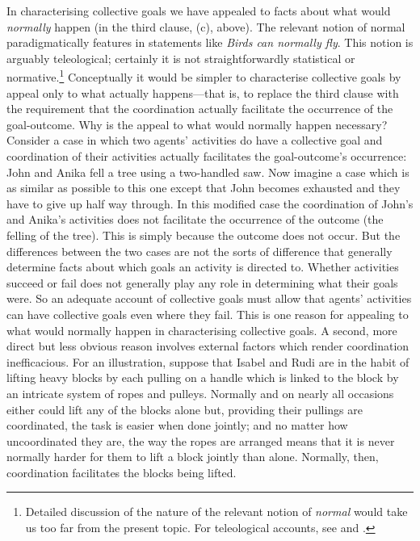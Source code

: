 \documentclass[12pt,a4paper]{extarticle}
\begin{document}
In characterising collective goals we have appealed to facts about what would \emph{normally} happen (in the third clause, (c), above).  
The relevant notion of normal paradigmatically features in statements like \emph{Birds can normally fly}.  
This notion is arguably teleological; certainly it is not  straightforwardly statistical or normative.\footnote{
Detailed discussion of the nature of the relevant notion of  \emph{normal} would take us too far from the present topic.
For teleological accounts, see 
	\citet[p.\ 33ff.]{Millikan:1984ib} and 
	\citet[p.\ 48ff.]{Price:2001hs}.
}
Conceptually it would be simpler to characterise collective goals by appeal only to what actually happens---that is, to replace the third clause with the requirement that the coordination actually facilitate the occurrence of the goal-outcome.  
Why is the appeal to what would normally happen necessary? 
Consider a case in which two agents' activities do have a collective goal and coordination of their activities actually facilitates the goal-outcome's occurrence: John and Anika fell a tree using a two-handled saw.  
Now imagine a case which is as similar as possible to this one except that John becomes exhausted and they have to give up half way through.  
In this modified case the coordination of John's and Anika's activities does not facilitate the occurrence of the outcome (the felling of the tree).
This is simply because the outcome does not occur.  
But the differences between the two cases are not the sorts of difference that generally determine facts about which goals an activity is directed to.  
Whether activities succeed or fail does not generally play any role in determining what their goals were.
So an adequate account of collective goals must allow that agents' activities can have collective goals even where they fail.  
This is one reason for appealing to what would normally happen in characterising collective goals.  
A second, more direct but less obvious reason involves external factors which render coordination inefficacious.  For an illustration, suppose that Isabel and Rudi are in the habit of lifting heavy blocks by each pulling on a handle which is linked to the block by an intricate system of ropes and pulleys.  
Normally and on nearly all occasions either could lift any of the blocks alone but, providing their pullings are coordinated, the task is easier when done jointly;
and no matter how uncoordinated they are, the way the ropes are arranged means that it is never normally harder for them to lift a block jointly than alone.  
Normally, then, coordination facilitates the blocks being lifted.  
\end{document}
